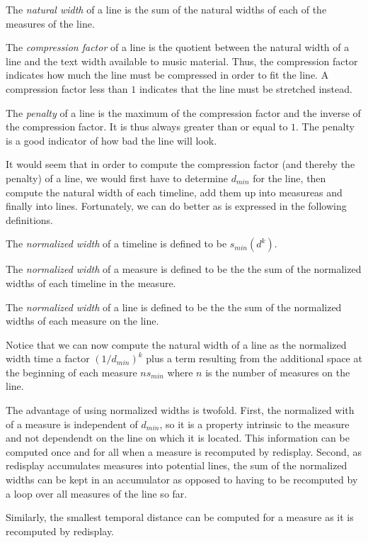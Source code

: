 \documentclass{article}
\begin{document}
The \emph{natural width} of a line is the sum of the natural widths of
each of the measures of the line.

The \emph{compression factor} of a line is the quotient between the
natural width of a line and the text width available to music
material.  Thus, the compression factor indicates how much the line
must be compressed in order to fit the line.  A compression factor
less than $1$ indicates that the line must be stretched instead. 

The \emph{penalty} of a line is the maximum of the compression factor
and the inverse of the compression factor.  It is thus always greater
than or equal to $1$.   The penalty is a good indicator of how bad the
line will look. 

It would seem that in order to compute the compression factor (and
thereby the penalty) of a line, we would first have to determine
$d_{min}$ for the line, then compute the natural width of each
timeline, add them up into measureas and finally into lines.
Fortunately, we can do better as is expressed in the following
definitions. 

The \emph{normalized width} of a timeline is defined to be $s_{min} (d
^ k)$.

The \emph{normalized width} of a measure is defined to be the the sum of
the normalized widths of each timeline in the measure.

The \emph{normalized width} of a line is defined to be the the sum of
the normalized widths of each measure on the line.

Notice that we can now compute the natural width of a line as the
normalized width time a factor $(1/d_{min})^k$ plus a term resulting
from the additional space at the beginning of each measure $n s_{min}$
where $n$ is the number of measures on the line. 

The advantage of using normalized widths is twofold.  First, the
normalized with of a measure is independent of $d_{min}$, so it is a
property intrinsic to the measure and not dependendt on the line on
which it is located.  This information can be computed once and for
all when a measure is recomputed by redisplay.  Second, as redisplay
accumulates measures into potential lines, the sum of the normalized
widths can be kept in an accumulator as opposed to having to be
recomputed by a loop over all measures of the line so far.  

Similarly, the smallest temporal distance can be computed for a
measure as it is recomputed by redisplay.  
\end{document}
